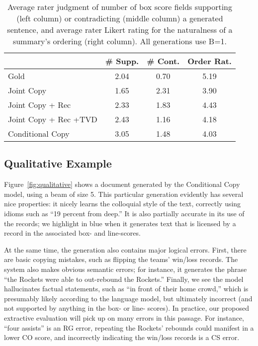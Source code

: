 \documentclass[11pt,letterpaper]{article}
\begin{document}
\begin{table}
\centering
\small
\begin{tabular}{l@{\hskip 1\tabcolsep}cc@{\hskip 1\tabcolsep}c}
\toprule
 &  \# Supp. & \# Cont. & Order Rat.  \\
\midrule
Gold             &  2.04  & 0.70 & 5.19 \\
Joint Copy             &  1.65  & 2.31 & 3.90 \\
Joint Copy + Rec       &  2.33  & 1.83 & 4.43 \\
Joint Copy + Rec +TVD  &  2.43  & 1.16 & 4.18 \\
Conditional Copy &  3.05  & 1.48 & 4.03 \\
\bottomrule
\end{tabular}
\caption{Average rater judgment of number of box score fields supporting (left column) or contradicting (middle column) a generated sentence, and average rater Likert rating for the naturalness of a summary's ordering (right column). All generations use B=1.}
\label{tab:humantable}
\end{table} 
 
\subsection{Qualitative Example}

Figure~\ref{fig:qualitative} shows a document generated by the Conditional Copy model, using a beam of size 5.  This particular generation evidently
has several nice properties: it nicely learns the colloquial
style of the text, correctly using idioms such as ``19 percent from
deep.'' It is also partially accurate in its use of the records; we highlight in blue when it generates text that is licensed by a record in the associated box- and line-scores.

At the same time, the generation also contains major logical errors. First, there are basic copying mistakes, such as flipping the teams' win/loss records. The system also makes obvious semantic errors; for instance, it generates the phrase ``the
Rockets were able to out-rebound the Rockets.'' Finally, we see the model hallucinates factual statements, such as ``in front of their home crowd,'' which is presumably likely according to the language model, but ultimately incorrect (and not supported by anything in the box- or line- scores).
In practice, our proposed extractive evaluation will pick up on many
errors in this passage. For instance, ``four assists'' is an RG error,
repeating the Rockets' rebounds could manifest in a lower CO score, and incorrectly indicating the win/loss records is a CS error.
\end{document}

